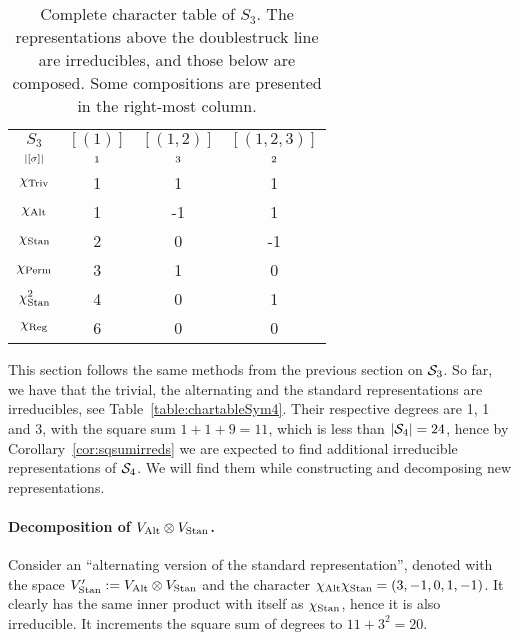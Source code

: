 {\begin{table}[hbt!]
		\begin{tabular}{c | c c c}
			$S_3$         & $[(1)]$   & $[(1,2)]$  & $[(1,2,3)]$ \\
			$\scriptstyle|[\sigma]|$    & $\scriptstyle 1$ & $\scriptstyle 3$ & $\scriptstyle 2$ \\ \hline
			$\chi_{\text{Triv}}$       & 1       & 1       & 1       \\
			$\chi_{\text{Alt}}$       & 1       & -1      & 1       \\
			$\chi_{\text{Stan}}$       & 2       & 0       & -1      \\ \hline\hline
			$\chi_{\text{Perm}}$       & 3       & 1       & 0       \\
			$\chi_{\text{Stan}}^2$ & 4       & 0       & 1       \\
			$\chi_{\text{Reg}}$       & 6       & 0       & 0       		\end{tabular}
			
		\caption{Complete character table of $S_3$. The representations above the doublestruck line are irreducibles, and those below are composed. Some compositions are presented in the right-most column.}
		\label{table:completecharS3}
	\end{table}

\begin{example}
	This section follows the same methods from the previous section on $\mathcal{S}_3$. So far, we have that the trivial, the alternating and the standard representations are irreducibles, see Table~\ref{table:chartableSym4}. Their respective degrees are 1, 1 and 3, with the square sum $1+1+9 = 11$, which is less than $|\mathcal{S}_4|=24$, hence by Corollary~\ref{cor:sqsumirreds} we are expected to find additional irreducible representations of $\mathcal{S}_4$. We will find them while constructing and decomposing new representations.
	
	\paragraph{Decomposition of $V_{\text{Alt}} \otimes V_{\text{Stan}}$.} Consider an ``alternating version of the standard representation'', denoted with the space $V'_{\text{Stan}} := V_{\text{Alt}} \otimes V_{\text{Stan}}$ and the character $\chi_{\text{Alt}}\chi_{\text{Stan}} = (3,-1,0,1,-1)$. It clearly has the same inner product with itself as $\chi_{\text{Stan}}$, hence it is also irreducible. It increments the square sum of degrees to $11 + 3^2 = 20$.
	

\end{example}}
